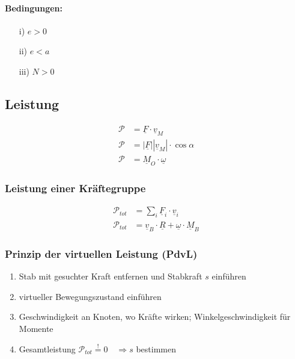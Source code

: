 \documentclass{article}
\begin{document}
\begin{multicols*}{4}
					\paragraph{Bedingungen:} %
						\begin{itemize}
							\item[i)] $e > 0$
							\item[ii)] $e < a$
							\item[iii)] $N > 0$
						\end{itemize}
					
					
			\subsection{Leistung} %
				\begin{align*}
					\mathcal{P} &= \underline{F} \cdot \underline{v}_M \\
					\mathcal{P} &= |\underline{F}| |\underline{v}_M| \cdot \cos{\alpha} \\
					\mathcal{P} &= \underline{M}_O \cdot \underline{\omega}
				\end{align*}
				\subsubsection{Leistung einer Kräftegruppe} %
					\begin{align*}
						\mathcal{P}_{tot} &= \sum_i \underline{F}_i \cdot \underline{v}_i \\
						\mathcal{P}_{tot} &= \underline{v}_B \cdot \underline{R} + \underline{\omega} \cdot \underline{M}_B
					\end{align*}
				\subsubsection{Prinzip der virtuellen Leistung (PdvL)} %
					\begin{enumerate}
						\item Stab mit gesuchter Kraft entfernen und Stabkraft $s$ einführen
						\item virtueller Bewegungszustand einführen
						\item Geschwindigkeit an Knoten, wo Kräfte wirken; Winkelgeschwindigkeit für Momente
						\item Gesamtleistung $\mathcal{P}_{tot} \stackrel{!}{=} 0 \quad \Rightarrow s$ bestimmen
					\end{enumerate}

\end{multicols*}
\end{document}
